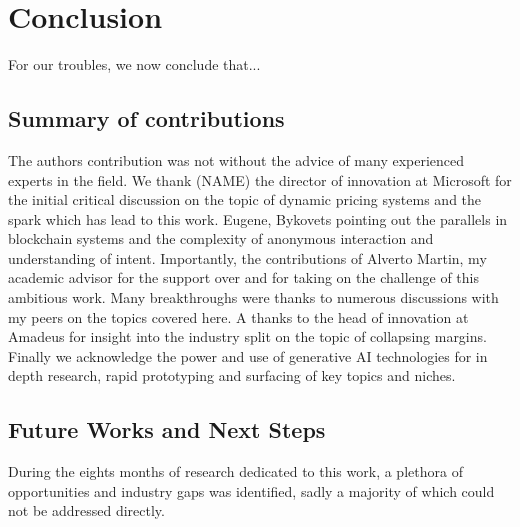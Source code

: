 \section{Conclusion}

For our troubles, we now conclude that...

\subsection{Summary of contributions}

The authors contribution was not without the advice of many experienced experts in the field. We thank (NAME) the director of innovation at Microsoft for the initial critical discussion on the topic of dynamic pricing systems and the spark which has lead to this work. Eugene, Bykovets pointing out the parallels in blockchain systems and the complexity of anonymous interaction and understanding of intent. Importantly, the contributions of Alverto Martin, my academic advisor for the support over and for taking on the challenge of this ambitious work. Many breakthroughs were thanks to numerous discussions with my peers on the topics covered here.
A thanks to the head of innovation at Amadeus for insight into the industry split on the topic of collapsing margins. Finally we acknowledge the power and use of generative AI technologies for in depth research, rapid prototyping and surfacing of key topics and niches.

\subsection{Future Works and Next Steps}

During the eights months of research dedicated to this work, a plethora of opportunities and industry gaps was identified, sadly a majority of which could not be addressed directly.
